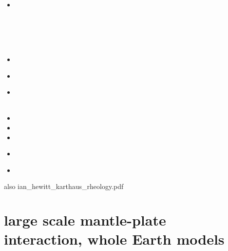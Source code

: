 \begin{small}
\begin{itemize}
 \\
\item[\twothousandsixteen] 
 \\
 \\
 \\
 \\
 \\
\item[\twothousandseventeen] 
 \\
\item[\twothousandeighteen] 
 \\
\item[\twothousandnineteen] 
 \\
 \\
\item[\twothousandtwenty] 
\item[\twothousandtwentyone] 
\item[\twothousandtwentytwo]
\item[\twothousandtwentythree]
 \\
\item[\twothousandtwentyfour]
 \\
\end{itemize}
\end{small}


also ian\_hewitt\_karthaus\_rheology.pdf

\section{large scale mantle-plate interaction, whole Earth models}

